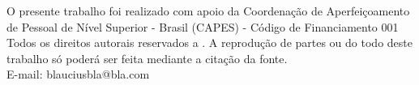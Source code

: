 
\addtocounter{page}{-1}
\begin{fichacatalografica}
O presente trabalho foi realizado com apoio da Coordenação de Aperfeiçoamento de Pessoal de Nível Superior - Brasil (CAPES) - Código de Financiamento 001
\vspace*{\fill}
\\
Todos os direitos autorais reservados a \imprimirautor. A reprodução de partes ou do todo deste trabalho só poderá ser feita mediante a citação da fonte.\\
E-mail: blauciusbla@bla.com
\end{fichacatalografica}

